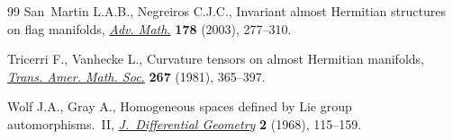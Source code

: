 \documentclass[10pt,a4paper]{amsart}
\numberwithin{equation}{section}
\begin{document}
\begin{thebibliography}{99}
San~Martin L.A.B., Negreiros C.J.C., Invariant almost {H}ermitian structures on
 flag manifolds, \href{https://doi.org/10.1016/S0001-8708(02)00073-7}{\textit{Adv. Math.}} \textbf{178} (2003), 277--310.

Tricerri F., Vanhecke L., Curvature tensors on almost {H}ermitian manifolds,
 \href{https://doi.org/10.2307/1998660}{\textit{Trans. Amer. Math. Soc.}} \textbf{267} (1981), 365--397.

Wolf J.A., Gray A., Homogeneous spaces defined by {L}ie group
 automorphisms.~{II}, \href{https://doi.org/10.4310/jdg/1214428252}{\textit{J.~Differential Geometry}} \textbf{2} (1968),
 115--159.

\end{thebibliography}
\end{document}

